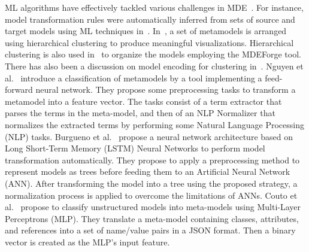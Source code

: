 \documentclass[journal,article,submit,moreauthors,technologies]{Definitions/mdpi}
\begin{document}
ML algorithms have effectively tackled various challenges in MDE~\cite{babur2018ammore}. For instance, model transformation rules were automatically inferred from sets of source and target models using ML techniques in~\cite{burgueno2019lstm, dolques2010learning}. In~\cite{babur2016hierarchical}, a set of metamodels is arranged using hierarchical clustering to produce meaningful visualizations. Hierarchical clustering is also used in~\cite{basciani2016automated} to organize the models employing the MDEForge tool. There has also been a discussion on model encoding for clustering in~\cite{babur2017using}.
Nguyen et al.~\cite{nguyen2019automated} introduce a classification of metamodels by a tool implementing a feed-forward neural network. They propose some preprocessing tasks to transform a metamodel into a feature vector. The tasks consist of a term extractor that parses the terms in the meta-model, and then of an NLP Normalizer that normalizes the extracted terms by performing some Natural Language Processing (NLP) tasks. Burgueno et al.~\cite{burgueno2019lstm} propose a neural network architecture based on Long Short-Term Memory (LSTM) Neural Networks to perform model transformation automatically. They propose to apply a preprocessing method to represent models as trees before feeding them to an Artificial Neural Network (ANN). After transforming the model into a tree using the proposed strategy, a normalization process is applied to overcome the limitations of ANNs. Couto et al.~\cite{couto2020classifying} propose to classify unstructured models into meta-models using Multi-Layer Perceptrons (MLP). They translate a meta-model containing classes, attributes, and references into a set of name/value pairs in a JSON format. Then a binary vector is created as the MLP's input feature.
\end{document}
